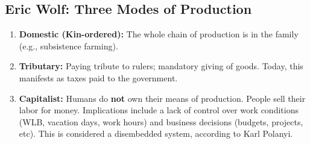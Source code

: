 \documentclass{article}
\begin{document}
\subsection{Eric Wolf: Three Modes of Production}
\begin{enumerate}
    \item \textbf{Domestic (Kin-ordered):} The whole chain of production is in the family (e.g., subsistence farming).
    \item \textbf{Tributary:} Paying tribute to rulers; mandatory giving of goods. Today, this manifests as taxes paid to the government.
    \item \textbf{Capitalist:} Humans do \textbf{not} own their means of production. People sell their labor for money. Implications include a lack of control over work conditions (WLB, vacation days, work hours) and business decisions (budgets, projects, etc). This is considered a disembedded system, according to Karl Polanyi.
\end{enumerate}
\end{document}
